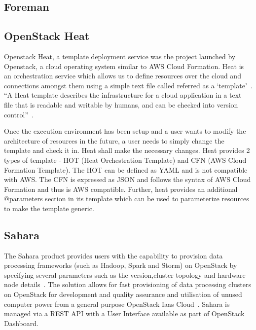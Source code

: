 {     \pv

\subsection{Foreman}

\pv 

\subsection{OpenStack Heat}

Openstack Heat, a template deployment service was the project launched
by Openstack, a cloud operating system similar to AWS Cloud
Formation. Heat is an orchestration service which allows us to define
resources over the cloud and connections amongst them using a simple
text file called referred as a
‘template’~\cite{www-heat-blog-introduction}.  ``A Heat template
describes the infrastructure for a cloud application in a text file
that is readable and writable by humans, and can be checked into
version control''~\cite{www-heat-wiki}.

     Once the execution environment has been setup and a user wants to
     modify the architecture of resources in the future, a user needs
     to simply change the template and check it in. Heat shall make
     the necessary changes. Heat provides 2 types of template -
     HOT (Heat Orchestration Template) and CFN (AWS Cloud Formation
     Template). The HOT can be defined as YAML and is not compatible
     with AWS. The CFN is expressed as JSON and follows the syntax of
     AWS Cloud Formation and thus is AWS compatible. Further, heat
     provides an additional @parameters section in its template which
     can be used to parameterize resources to make the template
     generic.

     \pv

\subsection{Sahara}

The Sahara product provides users with the capability to provision
data processing frameworks (such as Hadoop, Spark and Storm) on
OpenStack by specifying several parameters such as the version,cluster
topology and hardware node details~\cite{www-openStack}. The solution
allows for fast provisioning of data processing clusters on OpenStack
for development and quality assurance and utilisation of unused
computer power from a general purpose OpenStack Iaas
Cloud~\cite{www-Sahara}.  Sahara is managed via a REST API with a User
Interface available as part of OpenStack Dashboard.

}
